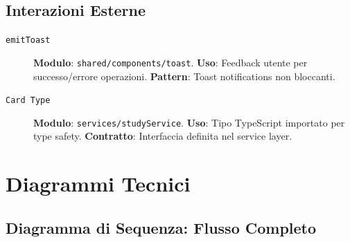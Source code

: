 \documentclass[11pt,a4paper]{article}
\begin{document}
\subsection{Interazioni Esterne}

\begin{description}
    \item[\texttt{emitToast}] \textbf{Modulo}: \texttt{shared/components/toast}. \textbf{Uso}: Feedback utente per successo/errore operazioni. \textbf{Pattern}: Toast notifications non bloccanti.
    
    \item[\texttt{Card Type}] \textbf{Modulo}: \texttt{services/studyService}. \textbf{Uso}: Tipo TypeScript importato per type safety. \textbf{Contratto}: Interfaccia definita nel service layer.
\end{description}


\section{Diagrammi Tecnici}

\subsection{Diagramma di Sequenza: Flusso Completo}
\end{document}
